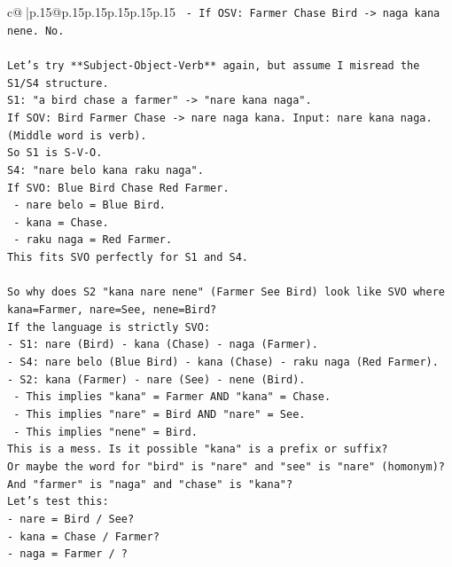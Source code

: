 \documentclass{article}
\begin{document}
{\begin{supertabular}{c@{$\;$}|p{.15\linewidth}@{}p{.15\linewidth}p{.15\linewidth}p{.15\linewidth}p{.15\linewidth}p{.15\linewidth}}
{{{\texttt{        {-} If OSV: Farmer Chase Bird {-}> naga kana nene. No.} \\
\\ 
\texttt{Let's try **Subject{-}Object{-}Verb** again, but assume I misread the S1/S4 structure.} \\
\texttt{S1: "a bird chase a farmer" {-}> "nare kana naga".} \\
\texttt{If SOV: Bird Farmer Chase {-}> nare naga kana. Input: nare kana naga. (Middle word is verb).} \\
\texttt{So S1 is S{-}V{-}O.} \\
\texttt{S4: "nare belo kana raku naga".} \\
\texttt{If SVO: Blue Bird Chase Red Farmer.} \\
\texttt{  {-} nare belo = Blue Bird.} \\
\texttt{  {-} kana = Chase.} \\
\texttt{  {-} raku naga = Red Farmer.} \\
\texttt{This fits SVO perfectly for S1 and S4.} \\
\\ 
\texttt{So why does S2 "kana nare nene" (Farmer See Bird) look like SVO where kana=Farmer, nare=See, nene=Bird?} \\
\texttt{If the language is strictly SVO:} \\
\texttt{{-} S1: nare (Bird) {-} kana (Chase) {-} naga (Farmer).} \\
\texttt{{-} S4: nare belo (Blue Bird) {-} kana (Chase) {-} raku naga (Red Farmer).} \\
\texttt{{-} S2: kana (Farmer) {-} nare (See) {-} nene (Bird).} \\
\texttt{  {-} This implies "kana" = Farmer AND "kana" = Chase.} \\
\texttt{  {-} This implies "nare" = Bird AND "nare" = See.} \\
\texttt{  {-} This implies "nene" = Bird.} \\
\texttt{This is a mess. Is it possible "kana" is a prefix or suffix?} \\
\texttt{Or maybe the word for "bird" is "nare" and "see" is "nare" (homonym)? And "farmer" is "naga" and "chase" is "kana"?} \\
\texttt{Let's test this:} \\
\texttt{{-} nare = Bird / See?} \\
\texttt{{-} kana = Chase / Farmer?} \\
\texttt{{-} naga = Farmer / ?} \\
}}}
\end{supertabular}}
\end{document}
